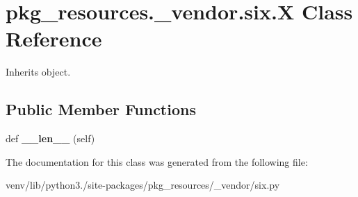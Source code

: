 \hypertarget{classpkg__resources_1_1__vendor_1_1six_1_1_x}{}\section{pkg\+\_\+resources.\+\_\+vendor.\+six.\+X Class Reference}
\label{classpkg__resources_1_1__vendor_1_1six_1_1_x}


Inherits object.

\subsection*{Public Member Functions}
\begin{DoxyCompactItemize}
\item 
\mbox{\label{classpkg__resources_1_1__vendor_1_1six_1_1_x_a1806903737a692c506d630bc8fc3147f}} 
def {\bfseries \+\_\+\+\_\+len\+\_\+\+\_\+} (self)
\end{DoxyCompactItemize}


The documentation for this class was generated from the following file\+:\begin{DoxyCompactItemize}
\item 
venv/lib/python3./site-\/packages/pkg\+\_\+resources/\+\_\+vendor/six.\+py\end{DoxyCompactItemize}
